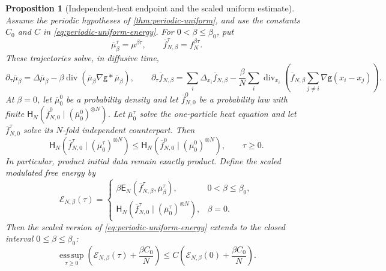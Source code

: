 \documentclass[11pt,reqno]{amsart}
\numberwithin{equation}{section}
\newtheorem{proposition}[proposition]{Proposition}
\theoremstyle{definition}
\theoremstyle{remark}
\newcommand{\g}{\mathsf g}
\newcommand{\Hr}{\mathsf H}
\newcommand{\Er}{\mathsf E}
\newcommand{\diver}{\operatorname{div}}
\newcommand{\esssup}{\operatorname*{ess\,sup}}
\begin{document}
\begin{proposition}[Independent-heat endpoint and the scaled uniform estimate]\label{prop:heat-endpoint}
Assume the periodic hypotheses of \cref{thm:periodic-uniform}, and use the constants $C_0$ and $C$ in \eqref{eq:periodic-uniform-energy}. For $0<\beta\leq\beta_0$, put
\begin{equation}\label{eq:diffusive-trajectories}
 \overline\mu_\beta^\tau=\mu^{\beta\tau},
 \qquad
 \overline f_{N,\beta}^\tau=f_N^{\beta\tau}.
\end{equation}
These trajectories solve, in diffusive time,
\begin{equation}\label{eq:diffusive-time}
 \partial_\tau\overline\mu_\beta
 =\Delta\overline\mu_\beta
 -\beta\diver(\overline\mu_\beta\nabla\g*\overline\mu_\beta),
 \qquad
 \partial_\tau\overline f_{N,\beta}
 =\sum_i\Delta_{x_i}\overline f_{N,\beta}
 -\frac\beta N\sum_i\diver_{x_i}\!\left(
  \overline f_{N,\beta}\sum_{j\ne i}\nabla\g(x_i-x_j)
 \right).
\end{equation}
At $\beta=0$, let $\overline\mu_0^0$ be a probability density and let $\overline f_{N,0}^0$ be a probability law with finite $\Hr_N(\overline f_{N,0}^0\mid(\overline\mu_0^0)^{\otimes N})$. Let $\overline\mu_0^\tau$ solve the one-particle heat equation and let $\overline f_{N,0}^\tau$ solve its $N$-fold independent counterpart. Then
\begin{equation}\label{eq:heat-endpoint-entropy}
 \Hr_N\!\left(\overline f_{N,0}^\tau\mid(\overline\mu_0^\tau)^{\otimes N}\right)
 \leq
 \Hr_N\!\left(\overline f_{N,0}^0\mid(\overline\mu_0^0)^{\otimes N}\right),
 \qquad \tau\geq0.
\end{equation}
In particular, product initial data remain exactly product. Define the scaled modulated free energy by
\begin{equation}\label{eq:scaled-energy-endpoint}
 \mathscr E_{N,\beta}(\tau)
 =
 \begin{cases}
  \beta \Er_N\!\left(\overline f_{N,\beta}^\tau,\overline\mu_\beta^\tau\right),&0<\beta\leq\beta_0,\\
  \Hr_N\!\left(\overline f_{N,0}^\tau\mid(\overline\mu_0^\tau)^{\otimes N}\right),&\beta=0.
 \end{cases}
\end{equation}
Then the scaled version of \eqref{eq:periodic-uniform-energy} extends to the closed interval $0\leq\beta\leq\beta_0$:
\begin{equation}\label{eq:scaled-uniform-closed-window}
 \esssup_{\tau\geq0}
 \left(\mathscr E_{N,\beta}(\tau)+\frac{\beta C_0}{N}\right)
 \leq
 C\left(\mathscr E_{N,\beta}(0)+\frac{\beta C_0}{N}\right).
\end{equation}
\end{proposition}
\end{document}
